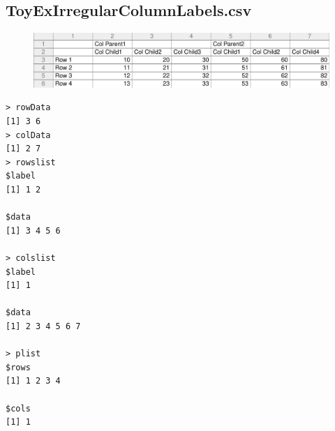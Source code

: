 \documentclass[a4paper]{article}
\begin{document}
\newpage
\subsection{ToyExIrregularColumnLabels.csv}
\label{sec:TCRO_ToyExIrregularColumnLabels.csv}
\begin{figure}[!h]
\centering
\includegraphics[width=\textwidth]{./TestCase/ToyExIrregularColumnLabels.pdf}
\end{figure}
\begin{verbatim}
> rowData 
[1] 3 6
> colData 
[1] 2 7
> rowslist 
$label
[1] 1 2

$data
[1] 3 4 5 6

> colslist 
$label
[1] 1

$data
[1] 2 3 4 5 6 7

> plist 
$rows
[1] 1 2 3 4

$cols
[1] 1


\end{verbatim}
\end{document}
